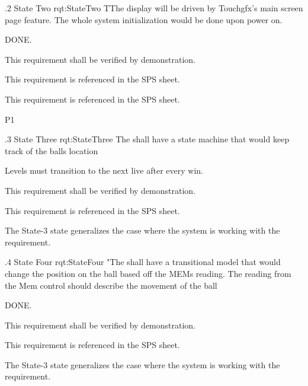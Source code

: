 \ONERQMTVKSA
{\RqtNumberBase.2}
{State Two}
{rqt:StateTwo}
{TThe display will be driven by Touchgfx's main screen page feature. The whole system initialization would be done upon power on.}
{
	\item [Phase 1] DONE.
}
{This requirement shall be verified by demonstration.}
{
	\item [SPS] This requirement is referenced in the SPS sheet.
}
{
	\item [N/A] This requirement is referenced in the SPS sheet.
}
{P1}


\ONERQMTV
{\RqtNumberBase.3}
{State Three}
{rqt:StateThree}
{The \ThisSys shall have a state machine that would keep track of the balls location}
{
	\item [Phase 1] Levels must transition to the next live after every win.
}
{This requirement shall be verified by demonstration.}
{
	\item [SPS] This requirement is referenced in the SPS sheet.
}
{
	\item The State-3 state generalizes the case where the system is working with the requirement.
}


\ONERQMTV
{\RqtNumberBase.4}
{State Four}
{rqt:StateFour}
{"The \ThisSys shall have a transitional model that would change the position on the ball based off the MEMs reading. The reading from the Mem control should describe the movement of the ball}
{
	\item [Phase 1] DONE.
}
{This requirement shall be verified by demonstration.}
{
	\item [SPS] This requirement is referenced in the SPS sheet.
}
{
	\item The State-3 state generalizes the case where the system is working with the requirement.
}


